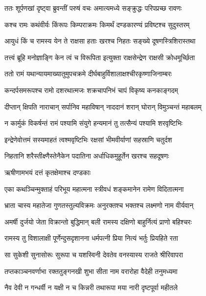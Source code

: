 
\twolineshloka
{ततः शूर्पणखां दृष्ट्वा ब्रुवन्तीं परुषं वचः}
{अमात्यमध्ये सङ्क्रुद्धः परिपप्रच्छ रावणः} %

\twolineshloka
{कश्च रामः कथंवीर्यः किंरूपः किम्पराक्रमः}
{किमर्थं दण्डकारण्यं प्रविष्टश्च सुदुस्तरम्} %

\twolineshloka
{आयुधं किं च रामस्य येन ते राक्षसा हताः}
{खरश्च निहतः सङ्ख्ये दूषणस्त्रिशिरास्तथा} %

\twolineshloka
{तत्त्वं ब्रूहि मनोज्ञाङ्गि केन त्वं च विरूपिता}
{इत्युक्ता राक्षसेन्द्रेण राक्षसी क्रोधमूर्च्छिता} %

\twolineshloka
{ततो रामं यथान्यायमाख्यातुमुपचक्रमे}
{दीर्घबाहुर्विशालाक्षश्चीरकृष्णाजिनाम्बरः} %

\twolineshloka
{कन्दर्पसमरूपश्च रामो दशरथात्मजः}
{शक्रचापनिभं चापं विकृष्य कनकाङ्गदम्} %

\twolineshloka
{दीप्तान् क्षिपति नाराचान् सर्पानिव महाविषान्}
{नाददानं शरान् घोरान् विमुञ्चन्तं महाबलम्} %

\twolineshloka
{न कार्मुकं विकर्षन्तं रामं पश्यामि संयुगे}
{हन्यमानं तु तत्सैन्यं पश्यामि शरवृष्टिभिः} %

\twolineshloka
{इन्द्रेणेवोत्तमं सस्यमाहतं त्वश्मवृष्टिभिः}
{रक्षसां भीमवीर्याणां सहस्राणि चतुर्दश} %

\twolineshloka
{निहतानि शरैस्तीक्ष्णैस्तेनैकेन पदातिना}
{अर्धाधिकमुहूर्तेन खरश्च सहदूषणः} %

\onelineshloka
{ऋषीणामभयं दत्तं कृतक्षेमाश्च दण्डकाः} %

\twolineshloka
{एका कथञ्चिन्मुक्ताहं परिभूय महात्मना}
{स्त्रीवधं शङ्कमानेन रामेण विदितात्मना} %

\twolineshloka
{भ्राता चास्य महातेजा गुणतस्तुल्यविक्रमः}
{अनुरक्तश्च भक्तश्च लक्ष्मणो नाम वीर्यवान्} %

\twolineshloka
{अमर्षी दुर्जयो जेता विक्रान्तो बुद्धिमान् बली}
{रामस्य दक्षिणो बाहुर्नित्यं प्राणो बहिश्चरः} %

\twolineshloka
{रामस्य तु विशालाक्षी पूर्णेन्दुसदृशानना}
{धर्मपत्नी प्रिया नित्यं भर्तुः प्रियहिते रता} %

\twolineshloka
{सा सुकेशी सुनासोरूः सुरूपा च यशस्विनी}
{देवतेव वनस्यास्य राजते श्रीरिवापरा} %

\twolineshloka
{तप्तकाञ्चनवर्णाभा रक्ततुङ्गनखी शुभा}
{सीता नाम वरारोहा वैदेही तनुमध्यमा} %

\twolineshloka
{नैव देवी न गन्धर्वी न यक्षी न च किन्नरी}
{तथारूपा मया नारी दृष्टपूर्वा महीतले} %

